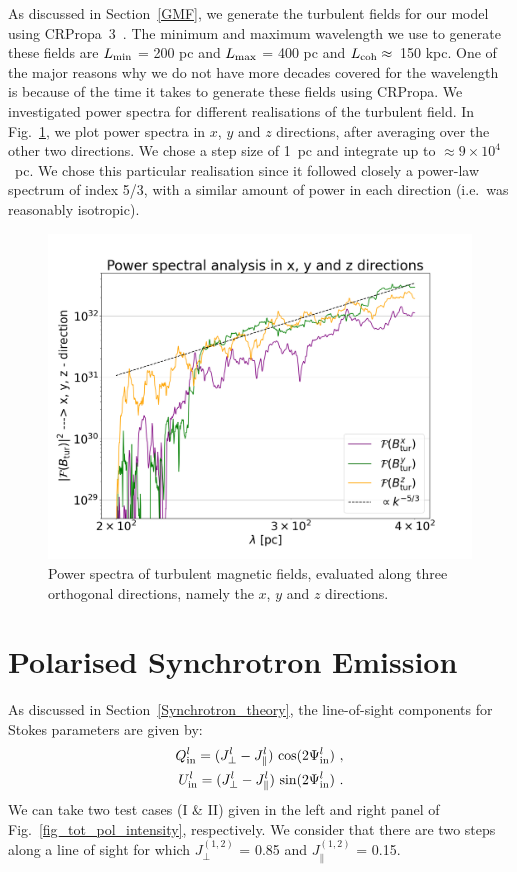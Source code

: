 \documentclass[usenatbib]{mnras}
\begin{document}
\label{Appendix_B}
As discussed in Section~\ref{GMF}, we generate the turbulent fields for our model using CRPropa~3~\citep{CRPropa3_2016}. The minimum and maximum wavelength we use to generate these fields are 
$L_{\rm min}$ = 200 pc and $L_{\rm max}$ = 400 pc and $L_{\rm coh} \approx $~150 kpc. One of the major reasons why we do not have more decades covered for the wavelength is because of the time it takes to generate these fields using CRPropa. 
We investigated power spectra for different realisations of the turbulent field. In Fig.~\ref{fig:PowerSpectrum}, we plot power spectra in $x$, $y$ and $z$ directions, after averaging over the other two directions. We chose a step size of 1~pc and integrate up to $\approx 9\times10^4$~pc. We chose this particular realisation since it followed closely a power-law spectrum of index 5/3, with a similar amount of power in each direction (i.e.~was reasonably isotropic). 

\begin{figure}
    \includegraphics[width = 0.49\linewidth]{Images/Jan27_Test_PowerSpectrum_vs_lambda_seed_10_lmin_200.0lmax_400.0.png}
    \caption{Power spectra of turbulent magnetic fields, evaluated along three orthogonal directions, namely the $x$, $y$ and $z$ directions.}
    \label{fig:PowerSpectrum}
\end{figure}

\section{Polarised Synchrotron Emission}
\label{Appendix_C}
As discussed in Section~\ref{Synchrotron_theory}, the line-of-sight components for Stokes parameters are given by:
\begin{eqnarray}
Q^l_{\rm in} = ({J_{\perp}^l} - J_{\parallel}^l) \ {\cos}(2\Psi^l_{\rm in}) \ ,\\ U^l_{\rm in} = ({J_{\perp}^l} - J_{\parallel}^l) \ {\sin}(2\Psi^l_{\rm in}) \ .
\end{eqnarray}
We can take two test cases (I \& II) given in the left and right panel of Fig.~\ref{fig_tot_pol_intensity}, respectively. We consider that there are two steps along a line of sight for which ${J_{\perp}^{(1,2)}}$ = 0.85 and $J_{\parallel}^{(1,2)}$  = 0.15. 
\end{document}
